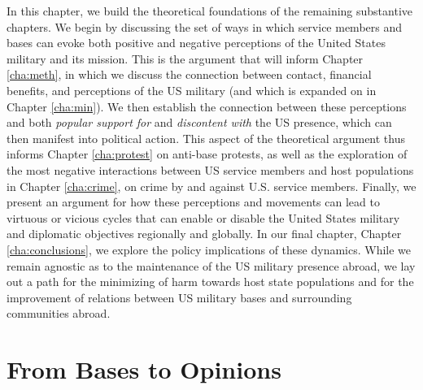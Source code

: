 {	In this chapter, we build the theoretical foundations of the remaining substantive chapters. We begin by discussing the set of ways in which service members and bases can evoke both positive and negative perceptions of the United States military and its mission. This is the argument that will inform Chapter \ref{cha:meth}, in which we discuss the connection between contact, financial benefits, and perceptions of the US military (and which is expanded on in Chapter \ref{cha:min}).  We then establish the connection between these perceptions and both \textit{popular support for} and \textit{\textit{discontent with}} the US presence, which can then manifest into political action. This aspect of the theoretical argument thus informs Chapter \ref{cha:protest} on anti-base protests, as well as the exploration of the most negative interactions between US service members and host populations in Chapter \ref{cha:crime}, on crime by and against U.S. service members. Finally, we present an argument for how these perceptions and movements can lead to virtuous or vicious cycles that can enable or disable the United States military and diplomatic objectives regionally and globally. In our final chapter, Chapter \ref{cha:conclusions}, we explore the policy implications of these dynamics. While we remain agnostic as to the maintenance of the US military presence abroad, we lay out a path for the minimizing of harm towards host state populations and for the improvement of relations between US military bases and surrounding communities abroad.  
	
	
\section*{From Bases to Opinions}

}
